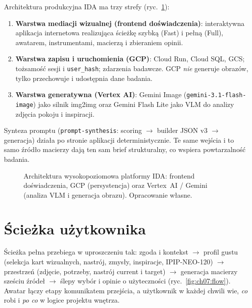 Architektura produkcyjna IDA ma trzy strefy (ryc.~\ref{fig:ch07:architecture}):

\begin{enumerate}
  \item \textbf{Warstwa mediacji wizualnej (frontend doświadczenia)}: interaktywna aplikacja internetowa realizująca ścieżkę szybką (Fast) i pełną (Full), awatarem, instrumentami, macierzą i zbieraniem opinii.
  \item \textbf{Warstwa zapisu i uruchomienia (GCP)}: Cloud Run, Cloud SQL, GCS; tożsamość sesji i \texttt{user\_hash}; zdarzenia badawcze. GCP \emph{nie} generuje obrazów, tylko przechowuje i udostępnia dane badania.
  \item \textbf{Warstwa generatywna (Vertex AI)}: Gemini Image (\texttt{gemini-3.1-flash-image}) jako silnik img2img oraz Gemini Flash Lite jako VLM do analizy zdjęcia pokoju i inspiracji.
\end{enumerate}

Synteza promptu (\texttt{prompt-synthesis}: scoring $\rightarrow$ builder JSON v3 $\rightarrow$ generacja) działa po stronie aplikacji deterministycznie. Te same wejścia i to samo źródło macierzy dają ten sam brief strukturalny, co wspiera powtarzalność badania.

\begin{figure}[htbp]
  \centering
  \caption{Architektura wysokopoziomowa platformy IDA: frontend doświadczenia, GCP (persystencja) oraz Vertex~AI / Gemini (analiza VLM i generacja obrazu). Opracowanie własne.}
  \label{fig:ch07:architecture}
\end{figure}

\section{Ścieżka użytkownika}
\label{ch07:sec:flow}

Ścieżka pełna przebiega w uproszczeniu tak: zgoda i kontekst $\rightarrow$ profil gustu (selekcja kart wizualnych, nastrój, zmysły, inspiracje, IPIP-NEO-120) $\rightarrow$ przestrzeń (zdjęcie, potrzeby, nastrój current i target) $\rightarrow$ generacja macierzy sześciu źródeł $\rightarrow$ ślepy wybór i opinie o użyteczności (ryc.~\ref{fig:ch07:flow}). Awatar łączy etapy komunikatem przejścia, a użytkownik w każdej chwili wie, \emph{co} robi i \emph{po co} w logice projektu wnętrza.

